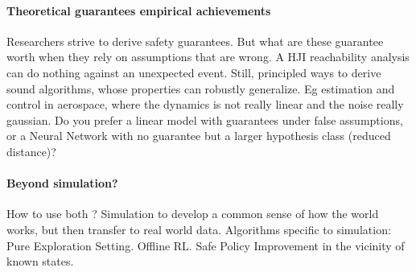 \paragraph{Theoretical guarantees \vs empirical achievements}
Researchers strive to derive safety guarantees. 
But what are these guarantee worth when they rely on assumptions that are wrong. 
A HJI reachability analysis can do nothing against an unexpected event.
Still, principled ways to derive sound algorithms, whose properties can robustly generalize. Eg estimation and control in aerospace, where the dynamics is not really linear and the noise really gaussian.
Do you prefer a linear model with guarantees under false assumptions, or a Neural Network with no guarantee but a larger hypothesis class (reduced distance)?

\paragraph{Beyond simulation?}
How to use both ?
Simulation to develop a common sense of how the world works, but then transfer to real world data.
Algorithms specific to simulation: Pure Exploration Setting.
Offline RL. Safe Policy Improvement in the vicinity of known states.





